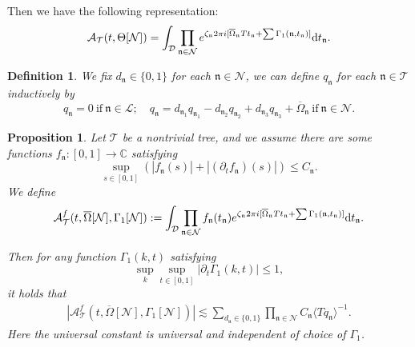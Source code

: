 \documentclass[UTF-8,reqno]{amsart}
\numberwithin{equation}{section}
\newtheorem{proposition}[theorem]{Proposition}
\newtheorem{definition}[theorem]{Definition}
\theoremstyle{definition}
\def\dif{{\mathord{{\rm d}}}}
\def\leq{\leqslant}
\def\dif{{\mathord{{\rm d}}}}
\def\leq{\leqslant}
\begin{document}
Then we have the following representation:
\begin{align*}
 \mathcal{A}_{\mathcal{T}}(t,\Theta[\mathcal{N}])=   \int_{\mathcal{D}}\prod_{\mathfrak{n}\in\mathcal{N}}  e^{\zeta_\mathfrak{n}2\pi i[\overline\Omega_\mathfrak{n}Tt_\mathfrak{n}+\sum\Gamma_1(\mathfrak{n},t_\mathfrak{n})] } \dif t_\mathfrak{n}.
\end{align*}
\begin{definition}
     We  fix $d_{\mathfrak{n}}\in\{0,1\}$ for each $\mathfrak{n}\in\mathcal{N}$, we can define $q_{\mathfrak{n}}$ for each $\mathfrak{n}\in\mathcal{T}$ inductively by
\begin{equation}%
q_{\mathfrak{n}}=0\mathrm{\ if\ }\mathfrak{n}\in\mathcal{L};\quad q_{\mathfrak{n}}=d_{\mathfrak{n}_1}q_{\mathfrak{n}_1}-d_{\mathfrak{n}_2}q_{\mathfrak{n}_2}+d_{\mathfrak{n}_3}q_{\mathfrak{n}_3}+\overline\Omega_{\mathfrak{n}}\mathrm{\ if\ }\mathfrak{n}\in\mathcal{N}.\end{equation}
\end{definition}
\begin{proposition}\label{prop:est:af}
Let $\mathcal{T}$ be a nontrivial tree, and we assume there are some functions  $f_{\mathfrak{n}}:[0,1]\to \mathbb{C}$ satisfying $$\sup_{s\in[0,1]}(|f_{\mathfrak{n}}(s)|+|(\partial_tf_{\mathfrak{n}})(s)|)\leq C_{\mathfrak{n}}.$$
We define
\begin{align}
 \mathcal{A}^f_{\mathcal{T}}(t,\overline\Omega[\mathcal{N}],\Gamma_1[\mathcal{N}]):=   \int_{\mathcal{D}}\prod_{\mathfrak{n}\in\mathcal{N}}  f_{\mathfrak{n}}(t_{\mathfrak{n}})e^{\zeta_\mathfrak{n}2\pi i[\overline\Omega_\mathfrak{n}Tt_\mathfrak{n}+\sum\Gamma_1(\mathfrak{n},t_\mathfrak{n})] } \dif t_\mathfrak{n}.\label{def:af}
\end{align}
 
Then for any function $\Gamma_1(k,t)$ satisfying $$\sup_k\sup_{t\in[0,1]}|\partial_t\Gamma_1(k,t)|\leq 1,$$
it holds that
\begin{align*}
    |\mathcal{A}^f_{\mathcal{T}}(t,\overline\Omega[\mathcal{N}],\Gamma_1[\mathcal{N}])|\lesssim \sum_{d_\mathfrak{n}\in\{0,1\}}\prod_{\mathfrak{n}\in\mathcal{N}}C_\mathfrak{n}\langle Tq_\mathfrak{n}\rangle^{-1}.
\end{align*}
Here the universal constant is universal and independent of choice of $\Gamma_1$.
\end{proposition}
\end{document}
